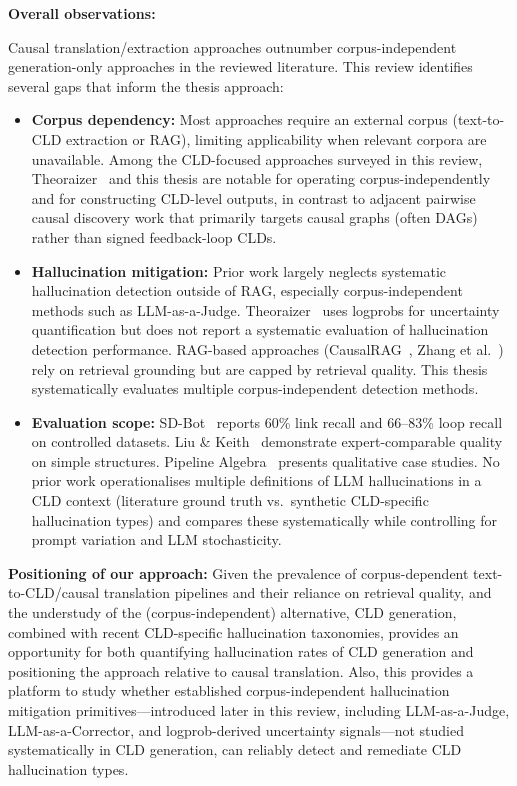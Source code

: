 \noindent\textbf{Overall observations:}

\noindent Causal translation/extraction approaches outnumber corpus-independent generation-only approaches in the reviewed literature. This review identifies several gaps that inform the thesis approach:

\begin{itemize}[noitemsep]
    \item \textbf{Corpus dependency:} Most approaches require an external corpus (text-to-CLD extraction or RAG), limiting applicability when relevant corpora are unavailable. Among the CLD-focused approaches surveyed in this review, Theoraizer~\citep{Waaijers2024theoraizer} and this thesis are notable for operating corpus-independently and for constructing CLD-level outputs, in contrast to adjacent pairwise causal discovery work that primarily targets causal graphs (often DAGs) rather than signed feedback-loop CLDs.
    \item \textbf{Hallucination mitigation:} Prior work largely neglects systematic hallucination detection outside of RAG, especially corpus-independent methods such as LLM-as-a-Judge. Theoraizer~\citep{Waaijers2024theoraizer} uses logprobs for uncertainty quantification but does not report a systematic evaluation of hallucination detection performance. RAG-based approaches (CausalRAG~\citep{wang2025causalrag}, Zhang et al.~\citep{zhang2024causal}) rely on retrieval grounding but are capped by retrieval quality. This thesis systematically evaluates multiple corpus-independent detection methods.
    \item \textbf{Evaluation scope:} SD-Bot~\citep{hosseinichimeh2024textmapdynamicsbot} reports 60\% link recall and 66--83\% loop recall on controlled datasets. Liu \& Keith~\citep{liu2025leveraging} demonstrate expert-comparable quality on simple structures. Pipeline Algebra~\citep{reinholtz2025pipelinealgebra} presents qualitative case studies. No prior work operationalises multiple definitions of LLM hallucinations in a CLD context (literature ground truth vs.\ synthetic CLD-specific hallucination types) and compares these systematically while controlling for prompt variation and LLM stochasticity.
\end{itemize}

\noindent\textbf{Positioning of our approach:} Given the prevalence of corpus-dependent text-to-CLD/causal translation pipelines and their reliance on retrieval quality, and the understudy of the (corpus-independent) alternative, CLD generation, combined with recent CLD-specific hallucination taxonomies, provides an opportunity for both quantifying hallucination rates of CLD generation and positioning the approach relative to causal translation. Also, this provides a platform to study whether established corpus-independent hallucination mitigation primitives---introduced later in this review, including LLM-as-a-Judge, LLM-as-a-Corrector, and logprob-derived uncertainty signals---not studied systematically in CLD generation, can reliably detect and remediate CLD hallucination types.

